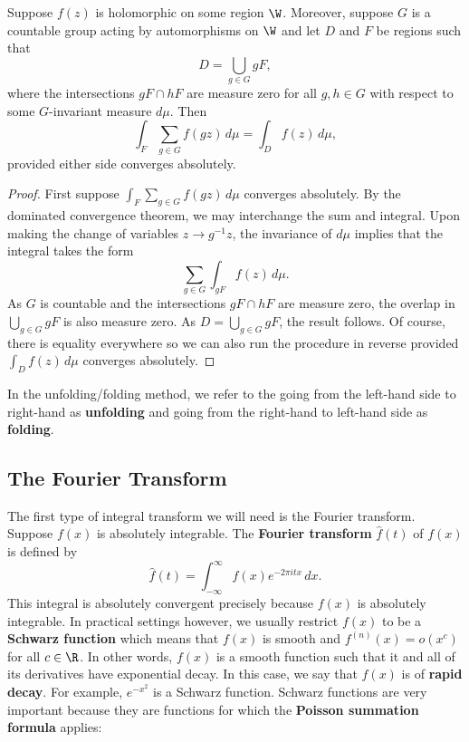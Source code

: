         \begin{theorem}
          Suppose $f(z)$ is holomorphic on some region $\W$. Moreover, suppose $G$ is a countable group acting by automorphisms on $\W$ and let $D$ and $F$ be regions such that
          \[
            D = \bigcup_{g \in G}gF,
          \]
          where the intersections $gF \cap hF$ are measure zero for all $g,h \in G$ with respect to some $G$-invariant measure $d\mu$. Then 
          \[
            \int_{F}\sum_{g \in G}f(g z)\,d\mu = \int_{D}f(z)\,d\mu,
          \]
          provided either side converges absolutely.
        \end{theorem}
        \begin{proof}
          First suppose $\int_{F}\sum_{g \in G}f(g z)\,d\mu$ converges absolutely. By the dominated convergence theorem, we may interchange the sum and integral. Upon making the change of variables $z \to g^{-1}z$, the invariance of $d\mu$ implies that the integral takes the form
          \[
            \sum_{g \in G}\int_{gF}f(z)\,d\mu.
          \]
          As $G$ is countable and the intersections $gF \cap hF$ are measure zero, the overlap in $\bigcup_{g \in G}gF$ is also measure zero. As $D = \bigcup_{g \in G}gF$, the result follows. Of course, there is equality everywhere so we can also run the procedure in reverse provided $\int_{D}f(z)\,d\mu$ converges absolutely.
        \end{proof}

        In the unfolding/folding method, we refer to the going from the left-hand side to right-hand as \textbf{unfolding} and going from the right-hand to left-hand side as \textbf{folding}.
      \subsection*{The Fourier Transform}
        The first type of integral transform we will need is the Fourier transform. Suppose $f(x)$ is absolutely integrable. The \textbf{Fourier transform} $\hat{f}(t)$ of $f(x)$ is defined by
        \[
          \hat{f}(t) = \int_{-\infty}^{\infty}f(x)e^{-2\pi itx}\,dx.
        \]
        This integral is absolutely convergent precisely because $f(x)$ is absolutely integrable. In practical settings however, we usually restrict $f(x)$ to be a \textbf{Schwarz function} which means that $f(x)$ is smooth and $f^{(n)}(x) = o(x^{c})$ for all $c \in \R$. In other words, $f(x)$ is a smooth function such that it and all of its derivatives have exponential decay. In this case, we say that $f(x)$ is of \textbf{rapid decay}. For example, $e^{-x^{2}}$ is a Schwarz function. Schwarz functions are very important because they are functions for which the \textbf{Poisson summation formula} applies:

